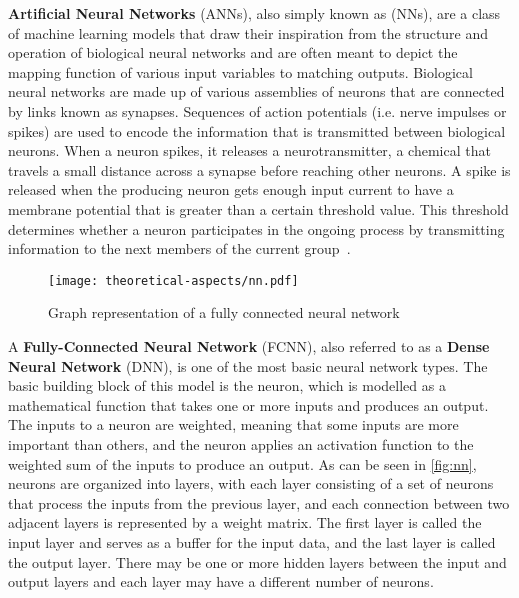 \textbf{Artificial Neural Networks} (ANNs), also simply known as  (NNs), are a class of machine learning models that draw their inspiration from the structure and operation of biological neural networks and are often meant to depict the mapping function of various input variables to matching outputs. Biological neural networks are made up of various assemblies of neurons that are connected by links known as synapses. Sequences of action potentials (i.e. nerve impulses or spikes) are used to encode the information that is transmitted between biological neurons. When a neuron spikes, it releases a neurotransmitter, a chemical that travels a small distance across a synapse before reaching other neurons. A spike is released when the producing neuron gets enough input current to have a membrane potential that is greater than a certain threshold value. This threshold determines whether a neuron participates in the ongoing process by transmitting information to the next members of the current group~\supercite{neuron}.
\begin{figure}[ht]
    \centering
    \texttt{[image: theoretical-aspects/nn.pdf]}
    \caption[Graph representation of a fully connected neural network]{Graph representation of a fully connected neural network~\supercite{tikz-nn}}
    \label{fig:nn}
\end{figure}

A \textbf{Fully-Connected Neural Network} (FCNN), also referred to as a \textbf{Dense Neural Network} (DNN), is one of the most basic neural network types. The basic building block of this model is the neuron, which is modelled as a mathematical function that takes one or more inputs and produces an output. The inputs to a neuron are weighted, meaning that some inputs are more important than others, and the neuron applies an activation function to the weighted sum of the inputs to produce an output. As can be seen in \autoref{fig:nn}, neurons are organized into layers, with each layer consisting of a set of neurons that process the inputs from the previous layer, and each connection between two adjacent layers is represented by a weight matrix. The first layer is called the input layer and serves as a buffer for the input data, and the last layer is called the output layer. There may be one or more hidden layers between the input and output layers and each layer may have a different number of neurons.

